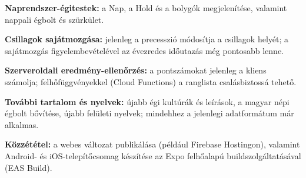 \documentclass[12pt,a4paper]{article}
\begin{document}
\textbf{Naprendszer-égitestek:} a Nap, a Hold és a bolygók megjelenítése, valamint nappali égbolt
és szürkület.

\textbf{Csillagok sajátmozgása:} jelenleg a precesszió módosítja a csillagok helyét; a
sajátmozgás figyelembevételével az évezredes időutazás még pontosabb lenne.

\textbf{Szerveroldali eredmény-ellenőrzés:} a pontszámokat jelenleg a kliens számolja;
felhőfüggvényekkel (Cloud Functions) a ranglista csalásbiztossá tehető.

\textbf{További tartalom és nyelvek:} újabb égi kultúrák és leírások, a magyar népi
égbolt bővítése, újabb felületi nyelvek; mindehhez a jelenlegi adatformátum már alkalmas.

\textbf{Közzététel:} a webes változat publikálása (például Firebase Hostingon), valamint Android-
és iOS-telepítőcsomag készítése az Expo felhőalapú buildszolgáltatásával (EAS Build).
\end{document}

